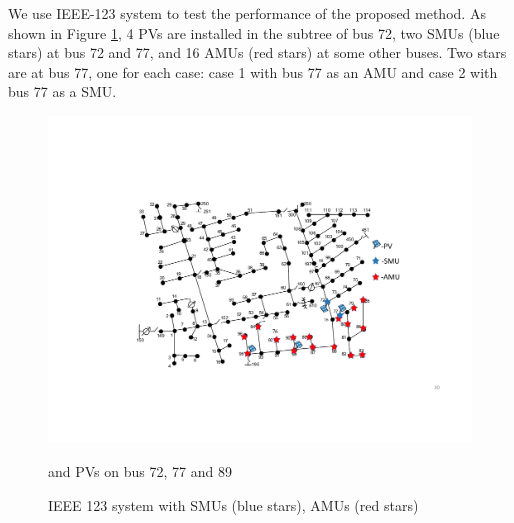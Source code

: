 \documentclass{article}
\begin{document}
We use IEEE-123 system to test the performance of the proposed method. As shown in Figure \ref{fig:123-7}, 4 PVs are installed in the subtree of bus 72, two SMUs (blue stars) at bus  72 and 77, and 16 AMUs (red stars) at some other buses. Two stars are at bus 77, one for each case: case 1 with bus 77 as an AMU and case 2 with bus 77 as a SMU.
\begin{figure}[h!]
    \centering
    \includegraphics[width=\linewidth]{pics/123-7.pdf}
    \caption{IEEE 123 system with SMUs (blue stars), AMUs (red stars) } and PVs on bus 72, 77 and 89
    \label{fig:123-7}
\end{figure}
\end{document}
